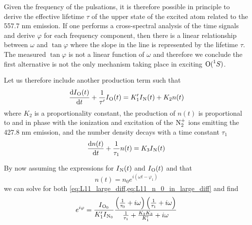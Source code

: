 Given the frequency of the pulsations, it is therefore possible in principle to derive the effective lifetime \(\tau \) of the upper state of the excited atom related to the 557.7 nm emission. If one performs a cross-spectral analysis of the time signals and derive \(\varphi \) for each frequency component, then there is a linear relationship between \(\omega \) and \(\tan\varphi \) where the slope in the line is represented by the lifetime \(\tau \). The measured \(\tan\varphi \) is not a linear function of \(\omega \) and therefore we conclude the first alternative is not the only mechanism taking place in exciting \(\prescript{}{}{\textnormal{O}}(\prescript{1}{}{S})\).

Let us therefore include another production term such that
\begin{equation}\label{eq:L11_large_diff}
    \frac{\textnormal{d}I_{\prescript{}{}{\textnormal{O}}}(t)}{\textnormal{d}t}+\frac{1}{\tau'}I_{\prescript{}{}{\textnormal{O}}}(t)=K_1'I_{\prescript{}{}{\textnormal{N}}}(t)+K_2n(t)
\end{equation}
where \(K_2\) is a proportionality constant, the production of \(n(t)\) is proportional to and in phase with the ionization and excitation of the \(\prescript{}{}{\textnormal{N}}_2^+\) ions emitting the 427.8 nm emission, and the number density decays with a time constant \(\tau_1\)
\begin{equation}\label{eq:L11_n_0_in_large_diff}
    \frac{\textnormal{d}n(t)}{\textnormal{d}t}+\frac{1}{\tau_1}n(t)=K_3I_{\prescript{}{}{\textnormal{N}}}(t)
\end{equation}

By now assuming the expressions for \(I_{\prescript{}{}{\textnormal{N}}}(t)\) and \(I_{\prescript{}{}{\textnormal{O}}}(t)\) and that
\begin{equation*}
    n(t)=n_0e^{i\left(\omega t-\varphi_1\right)}
\end{equation*}
we can solve for both \cref{eq:L11_large_diff,eq:L11_n_0_in_large_diff} and find
\begin{equation}\label{eq:L11_best_tan_varphi}
    e^{i\varphi}=\frac{I_{\prescript{}{}{\textnormal{O}}_0}}{K_1'I_{\prescript{}{}{\textnormal{N}}_0}}\frac{\left(\frac{1}{\tau_0}+i\omega\right)\left(\frac{1}{\tau_1}+i\omega\right)}{\frac{1}{\tau_1}+\frac{K_2K_3}{K_1'}+i\omega}
\end{equation}


